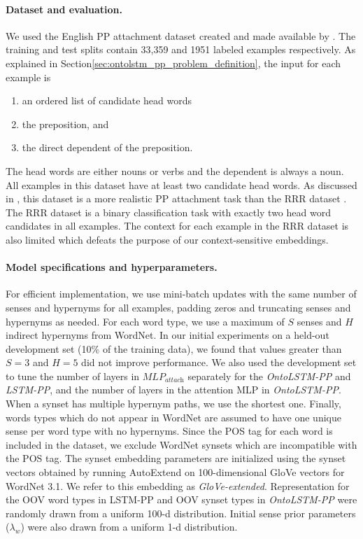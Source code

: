 \paragraph{Dataset and evaluation.} We used the English PP attachment dataset
created and made available by \cite{belinkov2014exploring}. The training and
test splits contain 33,359 and 1951 labeled examples respectively. As explained
in Section\ref{sec:ontolstm_pp_problem_definition}, the input for each example
is \begin{enumerate} \item an ordered list of candidate head words \item the
preposition, and \item the direct dependent of the preposition.  \end{enumerate}
	The head words are either nouns or verbs and the dependent is always a
	noun.  All examples in this dataset have at least two candidate head
	words.  As discussed in \cite{belinkov2014exploring}, this dataset is a
	more realistic PP attachment task than the RRR dataset
	\citep{ratnaparkhi1994maximum}.  The RRR dataset is a binary
	classification task with exactly two head word candidates in all
	examples.  The context for each example in the RRR dataset is also
	limited which defeats the purpose of our context-sensitive embeddings.

\paragraph{Model specifications and hyperparameters.} For efficient
implementation, we use mini-batch updates with the same number of senses and
hypernyms for all examples, padding zeros and truncating senses and hypernyms as
needed.  For each word type, we use a maximum of $S$ senses and $H$ indirect
hypernyms from WordNet.  In our initial experiments on a held-out development
set (10\% of the training data), we found that values greater than $S=3$ and
$H=5$ did not improve performance. We also used the development set to tune the
number of layers in $\textit{MLP}_{\textit{attach}}$ separately for the
\textit{OntoLSTM-PP} and \textit{LSTM-PP}, and the number of layers in the
attention MLP in \textit{OntoLSTM-PP}.  When a synset has multiple hypernym
paths, we use the shortest one.  Finally, words types which do not appear in
WordNet are assumed to have one unique sense per word type with no hypernyms.
Since the POS tag for each word is included in the dataset, we exclude WordNet
synsets which are incompatible with the POS tag.  The synset embedding
parameters are initialized using the synset vectors obtained by running
AutoExtend \citep{rothe:15} on 100-dimensional GloVe \citep{pennington2014glove}
vectors for WordNet 3.1. We refer to this embedding as \textit{GloVe-extended}.
Representation for the OOV word types in LSTM-PP and OOV synset types in
\textit{OntoLSTM-PP} were randomly drawn from a uniform 100-d distribution.
Initial sense prior parameters ($\lambda_w$) were also drawn from a uniform 1-d
distribution.


